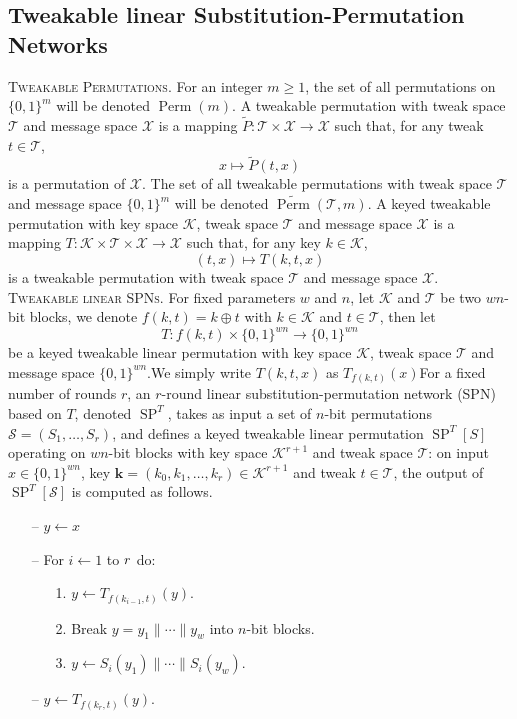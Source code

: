 \subsection{Tweakable linear Substitution-Permutation Networks}
\textsc{Tweakable Permutations.} For an integer $m \geq 1$, the set of all permutations
on $\{0,1\}^{m}$ will be denoted $\operatorname{Perm}(m)$. A tweakable permutation with tweak space $\mathcal{T}$ and message space $\mathcal{X}$ is a mapping $\widetilde{P} :\mathcal{T} \times \mathcal{X} \rightarrow \mathcal{X}$ such that, for any tweak $t \in \mathcal{T}$,
$$
x \mapsto \widetilde{P}(t,x)
$$
\noindent is a permutation of $\mathcal{X}$. The set of all tweakable permutations with tweak space $\mathcal{T}$ and message space $\{0,1\}^{m}$ will be denoted $\widetilde{\operatorname{Perm}}(\mathcal{T}, m)$.
  A keyed tweakable permutation with key space $\mathcal{K}$, tweak space $\mathcal{T}$ and message space $\mathcal{X}$ is a mapping $T : \mathcal{K} \times \mathcal{T} \times \mathcal{X} \rightarrow \mathcal{X}$ such that, for any key $k \in \mathcal{K}$,
$$
(t,x) \mapsto T(k,t,x)
$$
\noindent is a tweakable permutation with tweak space $\mathcal{T}$ and message space $\mathcal{X}$.\\

\textsc{Tweakable linear SPNs.} For fixed parameters $w$ and $n$, let $\mathcal{K}$ and $\mathcal{T}$ be two $w n$-bit blocks, we denote $f(k, t) = k \oplus t$ with $k \in \mathcal{K}$ and $t \in \mathcal{T}$, then let
$$
T: f(k, t) \times \{0,1\}^{w n} \rightarrow \{0,1\}^{w n}
$$
be a keyed tweakable linear permutation with key space $\mathcal{K}$, tweak space $\mathcal{T}$ and message space $\{0,1\}^{w n}$.We simply write $T(k,t,x)$ as $T_{f(k, t)}(x)$For a fixed number of rounds $r$, an $r$-round linear substitution-permutation network (SPN) based on $T$, denoted $\operatorname{SP}^T$, takes as input a set of $n$-bit permutations $\mathcal{S} = (S_1, \ldots, S_r)$, and defines a keyed tweakable  linear permutation $\operatorname{SP}^{T}[S]$ operating on $w n$-bit blocks with key space $\mathcal{K}^{r+1}$ and tweak space $\mathcal{T}$: on input $x \in \{0,1\}^{w n}$, key $\mathbf{k} = (k_0, k_1, \ldots, k_r) \in \mathcal{K}^{r+1}$ and tweak $t \in \mathcal{T}$, the output of $\operatorname{SP}^T[\mathcal{S}]$ is computed as follows.

\begin{itemize}
  \item[--]
  $y \leftarrow x$
  \item[--]
  For $i \leftarrow 1$ to $\mathnormal{r}$ do:
  \begin{itemize}
    \item[1.]
    $y \leftarrow T_{f(k_{i-1}, t)}(y)$.
    \item[2.]
    Break $y = y_1 \| \cdots \| y_w$ into $n$-bit blocks.
    \item[3.]
   $y \leftarrow S_i(y_1) \| \cdots \| S_i(y_w)$.
  \end{itemize}
  \item[--]
  $y \leftarrow T_{f(k_{r}, t)}(y)$.
\end{itemize}


